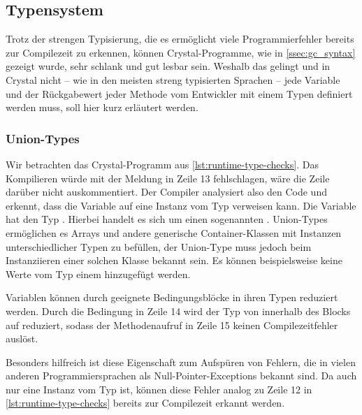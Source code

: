 \subsection{Typensystem}
\label{ssec:gc_typensystem}

Trotz der strengen Typisierung, die es ermöglicht viele Programmierfehler
bereits zur Compilezeit zu erkennen, können Crystal-Programme, wie in
\cref{ssec:gc_syntax} gezeigt wurde, sehr schlank und gut lesbar sein.  Weshalb
das gelingt und in Crystal nicht -- wie in den meisten streng typisierten
Sprachen -- jede Variable und der Rückgabewert jeder Methode vom Entwickler mit
einem Typen definiert werden muss, soll hier kurz erläutert werden.

\subsubsection{Union-Types}
\label{sssec:gct_union_types}

Wir betrachten das Crystal-Programm aus \cref{lst:runtime-type-checks}.  Das
Kompilieren würde mit der Meldung in Zeile 13 fehlschlagen, wäre die Zeile
darüber nicht auskommentiert.  Der Compiler analysiert also den Code und
erkennt, dass die Variable  auf eine Instanz vom Typ 
verweisen kann.  Die Variable hat den Typ .  Hierbei handelt
es sich um einen sogenannten .  Union-Types
ermöglichen es Arrays und andere generische Container-Klassen mit Instanzen
unterschiedlicher Typen zu befüllen, der Union-Type muss jedoch beim
Instanziieren einer solchen Klasse bekannt sein.  Es können beispielsweise
keine Werte vom Typ  einem  hinzugefügt
werden.

Variablen können durch geeignete Bedingungsblöcke in ihren Typen reduziert
werden.  Durch die Bedingung in Zeile 14 wird der Typ von  innerhalb
des Blocks auf  reduziert, sodass der Methodenaufruf in
Zeile 15 keinen Compilezeitfehler auslöst.

Besonders hilfreich ist diese Eigenschaft zum Aufspüren von Fehlern, die in
vielen anderen Programmiersprachen als Null-Pointer-Exceptions bekannt sind.  Da
 auch nur eine Instanz vom Typ  ist, können diese Fehler
analog zu Zeile 12 in \cref{lst:runtime-type-checks} bereits zur Compilezeit erkannt
werden.



